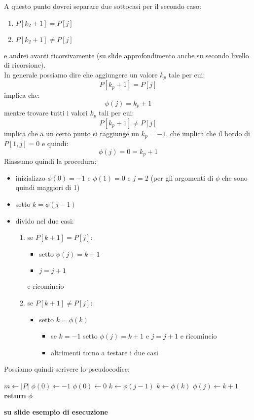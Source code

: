 \begin{definizione}
\begin{enumerate}
  \end{enumerate}
  A questo punto dovrei separare due sottocasi per il secondo caso:
  \begin{enumerate}
    \item $P[k_2+1] = P[j]$
    \item $P[k_2+1] \neq P[j]$
  \end{enumerate}
  e andrei avanti ricorsivamente (su slide approfondimento anche su secondo
  livello di ricorsione).\\
  In generale possiamo dire che aggiungere un valore $k_p$ tale per cui:
  \[P[k_p+1]=P[j]\]
  implica che:
  \[\phi(j)=k_p+1\]
  mentre trovare tutti i valori $k_p$ tali per cui:
  \[P[k_p+1]\neq P[j]\]
  implica che a un certo punto si raggiunge un $k_p = -1$, che implica che il
  bordo 
  di $P[1,j]=0$ e quindi:
  \[\phi(j)=0=k_p+1\]
  Riassumo quindi la procedura:
  \begin{itemize}
    \item inizializzo $\phi(0)=-1$ e $\phi(1)=0$ e $j=2$ (per gli argomenti di
    $\phi$ che sono quindi maggiori di 1)
    \item setto $k=\phi(j-1)$
    \item divido nel due casi:
    \begin{enumerate}
      \item se $P[k+1] = P[j] $:
      \begin{itemize}
        \item setto $\phi(j)=k+1$
        \item $j=j+1$
      \end{itemize}
      e ricomincio
      \item se $P[k+1] \neq P[j] $:
      \begin{itemize}
        \item setto $k=\phi(k)$
        \begin{itemize}
          \item se $k=-1$ setto $\phi(j)=k+1$ e $j=j+1$ e ricomincio 
          \item altrimenti torno a testare i due casi
        \end{itemize}
      \end{itemize}
    \end{enumerate}
  \end{itemize}
  \newpage
  Possiamo quindi scrivere lo pseudocodice:
  \begin{algorithm}[H]
    \begin{algorithmic}
      \State $m\gets |P|$
      \State $\phi(0)\gets -1$
      \State $\phi(0)\gets 0$
      \State $k\gets \phi(j-1)$
      \State $k \gets \phi(k)$
      \EndWhile
      \State $\phi(j)\gets k+1$
      \EndFor
      \State \textbf{return} $\phi$
      \EndFunction
    \end{algorithmic}
  \end{algorithm}
  \textbf{su slide esempio di esecuzione}
\end{definizione}
